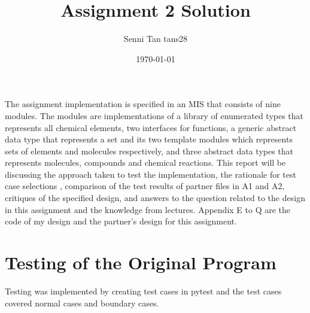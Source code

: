 \documentclass[12pt]{article}
\title{Assignment 2 Solution}
\author{Senni Tan   tans28}
\date{\today}
\begin{document}
\maketitle


The assignment implementation is specified in an MIS that consists of nine modules. The modules are implementations of a library of enumerated types that represents all chemical elements, two interfaces for functions, a generic abstract data type that represents a set and its two template modules which represents sets of elements and molecules respectively, and three abstract data types that represents molecules, compounds and chemical reactions. 
This report will be discussing the approach taken to test the implementation, the rationale for test case selections , comparison of the test results of partner files in A1 and A2, critiques of the specified design, and answers to the question related to the design in this assignment and the knowledge from lectures. Appendix E to Q are the code of my design and the partner's design for this assignment.

\section{Testing of the Original Program}

Testing was implemented by creating test cases in pytest and the test cases covered normal cases and boundary cases.\\

\smallskip
\end{document}
